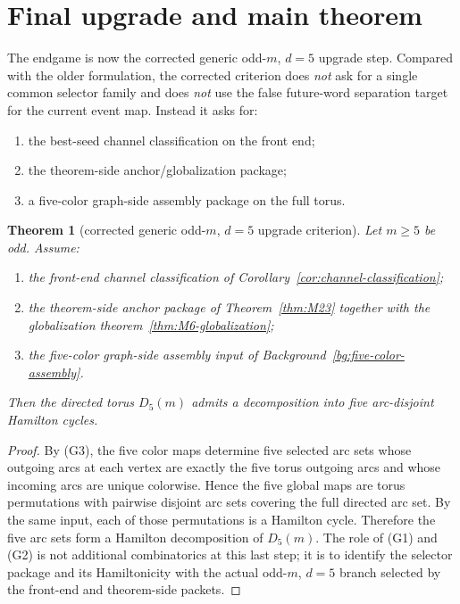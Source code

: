 \documentclass[11pt]{article}
\newtheorem{theorem}{Theorem}[section]
\begin{document}
\section{Final upgrade and main theorem}

The endgame is now the corrected generic odd-$m$, $d=5$ upgrade step.
Compared with the older formulation, the corrected criterion does \emph{not}
ask for a single common selector family and does \emph{not} use the false
future-word separation target for the current event map.
Instead it asks for:
\begin{enumerate}[label=\textup{(\arabic*)},leftmargin=2.8em]
\item the best-seed channel classification on the front end;
\item the theorem-side anchor/globalization package;
\item a five-color graph-side assembly package on the full torus.
\end{enumerate}

\begin{theorem}[corrected generic odd-$m$, $d=5$ upgrade criterion]
\label{thm:generic-upgrade}
Let $m\ge 5$ be odd.
Assume:
\begin{enumerate}[label=\textup{(G\arabic*)},leftmargin=3.0em]
\item the front-end channel classification of
      Corollary~\ref{cor:channel-classification};
\item the theorem-side anchor package of Theorem~\ref{thm:M23} together with
      the globalization theorem~\ref{thm:M6-globalization};
\item the five-color graph-side assembly input of
      Background~\ref{bg:five-color-assembly}.
\end{enumerate}
Then the directed torus $D_5(m)$ admits a decomposition into five arc-disjoint
Hamilton cycles.
\end{theorem}

\begin{proof}
By (G3), the five color maps determine five selected arc sets whose outgoing
arcs at each vertex are exactly the five torus outgoing arcs and whose incoming
arcs are unique colorwise.  Hence the five global maps are torus permutations
with pairwise disjoint arc sets covering the full directed arc set.
By the same input, each of those permutations is a Hamilton cycle.
Therefore the five arc sets form a Hamilton decomposition of $D_5(m)$.
The role of (G1) and (G2) is not additional combinatorics at this last step;
it is to identify the selector package and its Hamiltonicity with the actual
odd-$m$, $d=5$ branch selected by the front-end and theorem-side packets.
\end{proof}
\end{document}
